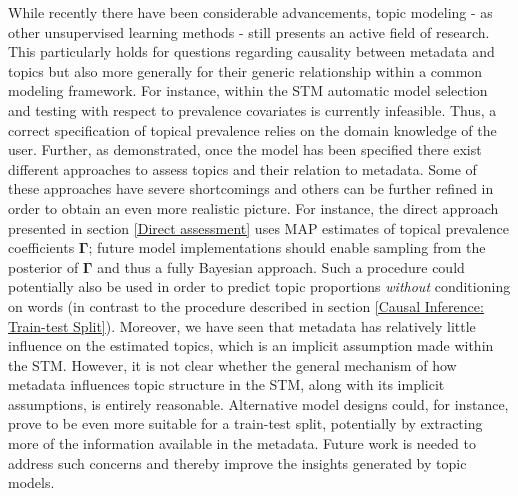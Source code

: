 While recently there have been considerable advancements, topic modeling - as other unsupervised learning methods - still presents an active field of research. This particularly holds for questions regarding causality between metadata and topics but also more generally for their generic relationship within a common modeling framework. For instance, within the STM automatic model selection and testing with respect to prevalence covariates is currently infeasible. Thus, a correct specification of topical prevalence relies on the domain knowledge of the user. Further, as demonstrated, once the model has been specified there exist different approaches to assess topics and their relation to metadata. Some of these approaches have severe shortcomings and others can be further refined in order to obtain an even more realistic picture. For instance, the direct approach presented in section \ref{Direct assessment} uses MAP estimates of topical prevalence coefficients $\boldsymbol{\Gamma}$; future model implementations should enable sampling from the posterior of $\boldsymbol{\Gamma}$ and thus a fully Bayesian approach. Such a procedure could potentially also be used in order to predict topic proportions \textit{without} conditioning on words (in contrast to the procedure described in section \ref{Causal Inference: Train-test Split}). Moreover, we have seen that metadata has relatively little influence on the estimated topics, which is an implicit assumption made within the STM. However, it is not clear whether the general mechanism of how metadata influences topic structure in the STM, along with its implicit assumptions, is entirely reasonable. Alternative model designs could, for instance, prove to be even more suitable for a train-test split, potentially by extracting more of the information available in the metadata. Future work is needed to address such concerns and thereby improve the insights generated by topic models.

